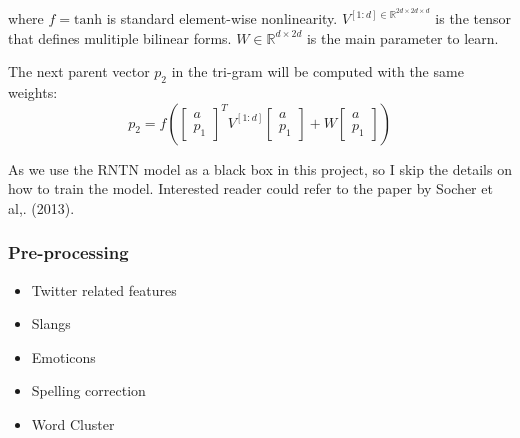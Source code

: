 where $f = \textrm{tanh}$ is standard element-wise nonlinearity. $V^{[1:d] \in \mathbb{R}^{2d \times 2d \times d}}$ is the tensor that defines mulitiple bilinear forms. $W \in \mathbb{R}^{d \times 2d}$ is the main parameter to learn. 

The next parent vector $p_2$ in the tri-gram will be computed with the same weights:
\begin{equation*}
p_2 = f \left(  
\begin{bmatrix}
a \\ p_1
\end{bmatrix}^T
V^{[1:d]} 
\begin{bmatrix}
a \\ p_1
\end{bmatrix}
+ W
\begin{bmatrix}
a \\ p_1
\end{bmatrix}
 \right)
\end{equation*}

As we use the RNTN model as a black box in this project, so I skip the details on how to train the model. Interested reader could refer to the paper by Socher et al,. (2013). 


\subsubsection{Pre-processing}
\begin{itemize}
\item Twitter related features
\item Slangs
\item Emoticons
\item Spelling correction
\item Word Cluster
\end{itemize}



